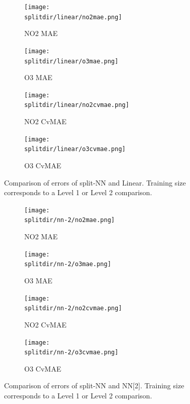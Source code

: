 \documentclass[journal abbreviation, manuscript]{copernicus}
\begin{document}
\begin{figure}[H]
\begin{subfigure}{0.49\textwidth}
\texttt{[image: \\splitdir/linear/no2mae.png]}
\caption{NO2 MAE}
\end{subfigure}
\begin{subfigure}{0.49\textwidth}
\texttt{[image: \\splitdir/linear/o3mae.png]}
\caption{O3 MAE}
\end{subfigure}
\begin{subfigure}{0.49\textwidth}
\texttt{[image: \\splitdir/linear/no2cvmae.png]}
\caption{NO2 CvMAE}
\end{subfigure}
\begin{subfigure}{0.49\textwidth}
\texttt{[image: \\splitdir/linear/o3cvmae.png]}
\caption{O3 CvMAE}
\end{subfigure}
\caption{Comparison of errors of split-NN and Linear. Training size corresponds to a Level 1 or Level 2 comparison.}
\end{figure}

\begin{figure}[H]
\begin{subfigure}{0.49\textwidth}
\texttt{[image: \\splitdir/nn-2/no2mae.png]}
\caption{NO2 MAE}
\end{subfigure}
\begin{subfigure}{0.49\textwidth}
\texttt{[image: \\splitdir/nn-2/o3mae.png]}
\caption{O3 MAE}
\end{subfigure}
\begin{subfigure}{0.49\textwidth}
\texttt{[image: \\splitdir/nn-2/no2cvmae.png]}
\caption{NO2 CvMAE}
\end{subfigure}
\begin{subfigure}{0.49\textwidth}
\texttt{[image: \\splitdir/nn-2/o3cvmae.png]}
\caption{O3 CvMAE}
\end{subfigure}
\caption{Comparison of errors of split-NN and NN[2]. Training size corresponds to a Level 1 or Level 2 comparison.}
\end{figure}
\end{document}
